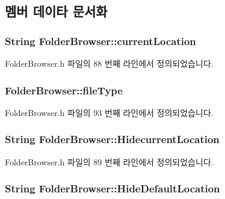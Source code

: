 \subsection{멤버 데이타 문서화}
\hypertarget{class_folder_browser_a1f7bc249da2f28c6a03759a983eacf75}{
\subsubsection[{current\+Location}]{\setlength{\rightskip}{0pt plus 5cm}String Folder\+Browser\+::current\+Location\hspace{0.3cm}{\ttfamily [private]}}}\label{class_folder_browser_a1f7bc249da2f28c6a03759a983eacf75}


Folder\+Browser.\+h 파일의 88 번째 라인에서 정의되었습니다.

\hypertarget{class_folder_browser_ab240fcb3674e6887f601fd23c25477f3}{
\subsubsection[{file\+Type}]{ Folder\+Browser\+::file\+Type\hspace{0.3cm}{\ttfamily [private]}}}\label{class_folder_browser_ab240fcb3674e6887f601fd23c25477f3}


Folder\+Browser.\+h 파일의 93 번째 라인에서 정의되었습니다.

\hypertarget{class_folder_browser_acfb2670184ff88e3b06e2562d02983ce}{
\subsubsection[{Hidecurrent\+Location}]{\setlength{\rightskip}{0pt plus 5cm}String Folder\+Browser\+::\+Hidecurrent\+Location\hspace{0.3cm}{\ttfamily [private]}}}\label{class_folder_browser_acfb2670184ff88e3b06e2562d02983ce}


Folder\+Browser.\+h 파일의 89 번째 라인에서 정의되었습니다.

\hypertarget{class_folder_browser_a7573f676c492fcd3a5d63319cd5eb325}{
\subsubsection[{Hide\+Default\+Location}]{\setlength{\rightskip}{0pt plus 5cm}String Folder\+Browser\+::\+Hide\+Default\+Location\hspace{0.3cm}{\ttfamily [private]}}}\label{class_folder_browser_a7573f676c492fcd3a5d63319cd5eb325}


